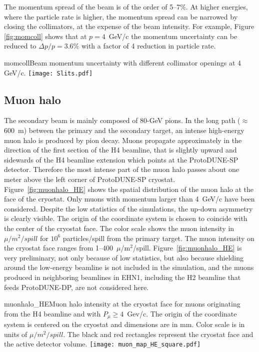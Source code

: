 The momentum spread of the beam is of the order of 5--7\%. At higher energies, where
the particle rate is higher, the momentum spread  can be narrowed by
closing the collimators, at the expense of the beam intensity.  For example, Figure \ref{fig:momcoll} shows
that at $p=4$~GeV/c the momentum uncertainty can be  reduced to $\Delta p/p= 3.6\%$ with a factor of 4 reduction in particle rate.  
\begin{cdrfigure}{momcoll}{Beam momentum uncertainty with different collimator openings at 4 GeV/c.}
  \texttt{[image: Slits.pdf]}
\end{cdrfigure}


\subsection{Muon halo}
The secondary beam is mainly composed of 80-GeV pions. In the long path ($\approx$ 600~m) between the primary and the secondary target,
 an intense high-energy muon halo is produced by pion decay. Muons propagate approximately in the direction of the first section of the H4 beamline,  that is slightly upward  and sidewards of the H4 beamline extension which points at the ProtoDUNE-SP detector.  
 Therefore the most intense part of the muon halo passes about one meter above the left corner of ProtoDUNE-SP cryostat. 
Figure~\ref{fig:muonhalo_HE} shows the spatial distribution of the muon halo at the face of the cryostat. Only muons with momentum larger than 4~GeV/c have been considered. Despite the low statistics of the simulations, the up-down asymmetry is clearly visible. The origin of the coordinate system is chosen to coincide with the center of the cryostat face. The color scale shows the muon intensity in $\mu /m^2/spill$ for $10^6$ particles/spill from the primary target. The muon intensity on the cryostat face ranges from 1--400~$\mu$/m$^2$/spill.
Figure~\ref{fig:muonhalo_HE}  is very preliminary, not only because of low statistics, but also because shielding around the low-energy beamline is not included in the simulation, and the muons produced in neighboring beamlines in EHN1, including the H2 beamline that feeds ProtoDUNE-DP, are not considered here. 
\begin{cdrfigure}{muonhalo_HE}{Muon halo intensity at the cryostat face for muons originating from the H4 beamline and with $P_\mu  \ge 4$~Gev/c. The origin of the coordinate system is centered on the cryostat and dimensions are in mm. Color scale is in units of $\mu /m^2/spill$. The black and red rectangles represent the cryostat face and the active detector volume.}
\texttt{[image: muon\_map\_HE\_square.pdf]}
\end{cdrfigure}




